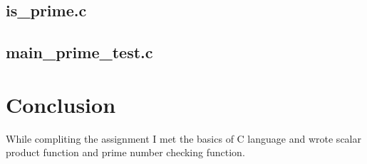 \documentclass[12pt, a4paper]{article}
\begin{document}
\subsection*{is\_prime.c}


\subsection*{main\_prime\_test.c}


\section*{Conclusion}
While compliting the assignment I met the basics of C language and wrote scalar product function and prime number checking function.
\end{document}
